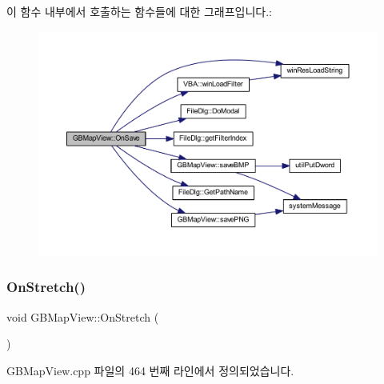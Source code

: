 이 함수 내부에서 호출하는 함수들에 대한 그래프입니다.\+:
\nopagebreak
\begin{figure}[H]
\begin{center}
\leavevmode
\includegraphics[width=350pt]{class_g_b_map_view_a667f0f830b816e2ec34519d75a5ad488_cgraph}
\end{center}
\end{figure}
\mbox{\label{class_g_b_map_view_a9938d288e7e3c1b36757cbf49ff4bb97}} 
\subsubsection{\texorpdfstring{On\+Stretch()}{OnStretch()}}
{\footnotesize\ttfamily void G\+B\+Map\+View\+::\+On\+Stretch (\begin{DoxyParamCaption}{ }\end{DoxyParamCaption})\hspace{0.3cm}{\ttfamily [protected]}}



G\+B\+Map\+View.\+cpp 파일의 464 번째 라인에서 정의되었습니다.


